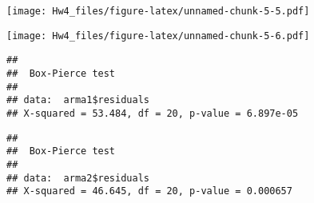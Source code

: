 \documentclass[]{article}
\newenvironment{Shaded}{\begin{snugshade}}{\end{snugshade}}
\newcommand{\KeywordTok}[1]{\textcolor[rgb]{0.13,0.29,0.53}{\textbf{#1}}}
\newcommand{\DataTypeTok}[1]{\textcolor[rgb]{0.13,0.29,0.53}{#1}}
\newcommand{\DecValTok}[1]{\textcolor[rgb]{0.00,0.00,0.81}{#1}}
\newcommand{\StringTok}[1]{\textcolor[rgb]{0.31,0.60,0.02}{#1}}
\newcommand{\OperatorTok}[1]{\textcolor[rgb]{0.81,0.36,0.00}{\textbf{#1}}}
\newcommand{\NormalTok}[1]{#1}
\begin{document}
\begin{Shaded}
\end{Shaded}

\texttt{[image: Hw4\_files/figure-latex/unnamed-chunk-5-5.pdf]}

\begin{Shaded}
\end{Shaded}

\texttt{[image: Hw4\_files/figure-latex/unnamed-chunk-5-6.pdf]}

\begin{Shaded}
\end{Shaded}

\begin{verbatim}
## 
##  Box-Pierce test
## 
## data:  arma1$residuals
## X-squared = 53.484, df = 20, p-value = 6.897e-05
\end{verbatim}

\begin{Shaded}
\end{Shaded}

\begin{verbatim}
## 
##  Box-Pierce test
## 
## data:  arma2$residuals
## X-squared = 46.645, df = 20, p-value = 0.000657
\end{verbatim}

\begin{Shaded}
\end{Shaded}
\end{document}

